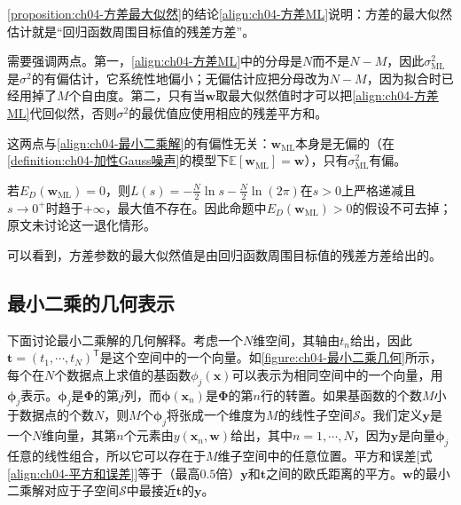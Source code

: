 \documentclass[../../main.tex]{subfiles}
\begin{document}
\begin{remark}
\cref{proposition:ch04-方差最大似然}的结论\eqref{align:ch04-方差ML}说明：方差的最大似然估计就是“回归函数周围目标值的残差方差”。

需要强调两点。第一，\eqref{align:ch04-方差ML}中的分母是$N$而不是$N-M$，因此$\sigma^2_{\mathrm{ML}}$是$\sigma^2$的有偏估计，它系统性地偏小；无偏估计应把分母改为$N-M$，因为拟合时已经用掉了$M$个自由度。第二，只有当$\boldsymbol{w}$取最大似然值时才可以把\eqref{align:ch04-方差ML}代回似然，否则$\sigma^2$的最优值应使用相应的残差平方和。

这两点与\eqref{align:ch04-最小二乘解}的有偏性无关：$\boldsymbol{w}_{\mathrm{ML}}$本身是无偏的（在\cref{definition:ch04-加性Gauss噪声}的模型下$\mathbb{E}[\boldsymbol{w}_{\mathrm{ML}}]=\boldsymbol{w}$），只有$\sigma^2_{\mathrm{ML}}$有偏。

若$E_D(\boldsymbol{w}_{\mathrm{ML}})=0$，则$L(s)=-\frac{N}{2}\ln s-\frac{N}{2}\ln(2\pi)$在$s>0$上严格递减且$s\to0^{+}$时趋于$+\infty$，最大值不存在。因此命题中$E_D(\boldsymbol{w}_{\mathrm{ML}})>0$的假设不可去掉；原文未讨论这一退化情形。
\end{remark}

可以看到，方差参数的最大似然值是由回归函数周围目标值的残差方差给出的。

\subsection{最小二乘的几何表示}\label{subsection:ch04-最小二乘几何}

下面讨论最小二乘解的几何解释。考虑一个$N$维空间，其轴由$t_n$给出，因此$\boldsymbol{t}=(t_1,\cdots,t_N)^{\mathsf{T}}$是这个空间中的一个向量。如\cref{figure:ch04-最小二乘几何}所示，每个在$N$个数据点上求值的基函数$\phi_j(\boldsymbol{x})$可以表示为相同空间中的一个向量，用$\boldsymbol{\phi}_j$表示。$\boldsymbol{\phi}_j$是$\boldsymbol{\Phi}$的第$j$列，而$\boldsymbol{\phi}(\boldsymbol{x}_n)$是$\boldsymbol{\Phi}$的第$n$行的转置。如果基函数的个数$M$小于数据点的个数$N$，则$M$个$\boldsymbol{\phi}_j$将张成一个维度为$M$的线性子空间$\mathcal{S}$。我们定义$\boldsymbol{y}$是一个$N$维向量，其第$n$个元素由$y(\boldsymbol{x}_n,\boldsymbol{w})$给出，其中$n=1,\cdots,N$，因为$\boldsymbol{y}$是向量$\boldsymbol{\phi}_j$任意的线性组合，所以它可以存在于$M$维子空间中的任意位置。平方和误差[式\eqref{align:ch04-平方和误差}]等于（最高$0.5$倍）$\boldsymbol{y}$和$\boldsymbol{t}$之间的欧氏距离的平方。$\boldsymbol{w}$的最小二乘解对应于子空间$\mathcal{S}$中最接近$\boldsymbol{t}$的$\boldsymbol{y}$。
\end{document}
